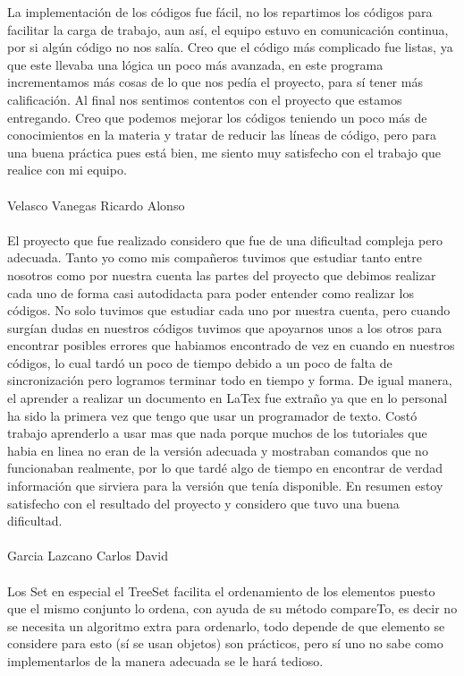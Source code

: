 \documentclass{article}
\begin{document}
La implementación de los códigos fue fácil, no los repartimos los códigos para facilitar la carga de trabajo, aun así, el equipo estuvo en comunicación continua, por si algún código no nos salía. Creo que el código más complicado fue listas, ya que este llevaba una lógica un poco más avanzada, en este programa incrementamos más cosas de lo que nos pedía el proyecto, para sí tener más calificación. Al final nos sentimos contentos con el proyecto que estamos entregando. Creo que podemos mejorar los códigos teniendo un poco más de conocimientos en la materia y tratar de reducir las líneas de código, pero para una buena práctica pues está bien, me siento muy satisfecho con el trabajo que realice con mi equipo.
	\\
	\\	
	\large  Velasco Vanegas Ricardo Alonso
	\\
	\\	
	\normalsize El proyecto que fue realizado considero que fue de una dificultad compleja pero adecuada. Tanto yo como mis compañeros tuvimos que estudiar tanto entre nosotros como por nuestra cuenta las partes del proyecto que debimos realizar cada uno de forma casi autodidacta para poder entender como realizar los códigos. No solo tuvimos que estudiar cada uno por nuestra cuenta, pero cuando surgían dudas en nuestros códigos tuvimos que apoyarnos unos a los otros para encontrar posibles errores que habiamos encontrado de vez en cuando en nuestros códigos, lo cual tardó un poco de tiempo debido a un poco de falta de sincronización pero logramos terminar todo en tiempo y forma. De igual manera, el aprender a realizar un documento en LaTex fue extraño ya que en lo personal ha sido la primera vez que tengo que usar un programador de texto. Costó trabajo aprenderlo a usar mas que nada porque muchos de los tutoriales que habia en linea no eran de la versión adecuada y mostraban comandos que no funcionaban realmente, por lo que tardé algo de tiempo en encontrar de verdad información que sirviera para la versión que tenía disponible. En resumen estoy satisfecho con el resultado del proyecto y considero que tuvo una buena dificultad.
	\\
	\\	
	\large  Garcia Lazcano Carlos David
	\\
	\\	
	\normalsize Los Set en especial el TreeSet facilita el ordenamiento de los elementos puesto que el mismo conjunto lo ordena, con ayuda de su método compareTo, es decir no se necesita un algoritmo extra para ordenarlo, todo depende de que elemento se considere para esto (sí se usan objetos) son prácticos, pero sí uno no sabe como implementarlos de la manera adecuada se le hará tedioso.
\end{document}
